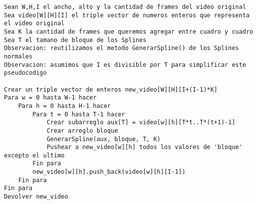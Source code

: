 \begin{lstlisting}
Sean W,H,I el ancho, alto y la cantidad de frames del video original
Sea video[W][H][I] el triple vector de numeros enteros que representa el video original
Sea K la cantidad de frames que queremos agregar entre cuadro y cuadro
Sea T el tamano de bloque de los Splines
Observacion: reutilizamos el metodo GenerarSpline() de los Splines normales
Observacion: asumimos que I es divisible por T para simplificar este pseudocodigo

Crear un triple vector de enteros new_video[W][H][I+(I-1)*K]
Para w = 0 hasta W-1 hacer
	Para h = 0 hasta H-1 hacer
		Para t = 0 hasta T-1 hacer
			Crear subarreglo aux[T] = video[w][h][T*t..T*(t+1)-1]
			Crear arreglo bloque
			GenerarSpline(aux, bloque, T, K)
			Pushear a new_video[w][h] todos los valores de 'bloque' excepto el ultimo
		Fin para
		new_video[w][h].push_back(video[w][h][I-1])
	Fin para
Fin para
Devolver new_video
\end{lstlisting}
